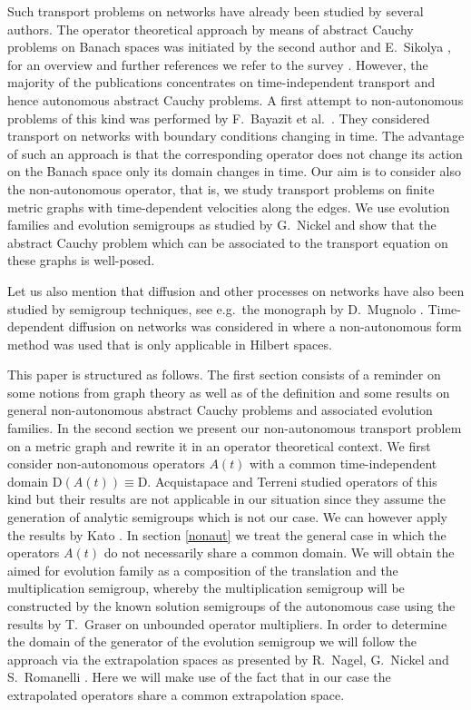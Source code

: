 \documentclass[a4paper,oneside,10pt]{amsart}
\theoremstyle{definition}
\numberwithin{equation}{section}
\def\dom{\mathrm{D}}
\begin{document}
\medskip
Such transport problems on networks have  already been studied by several authors. The operator theoretical approach by means of abstract Cauchy problems on Banach spaces was initiated by the second author and E.~Sikolya \cite{KS2005}, for an overview and further references  we refer to the survey \cite{KP2020}. However, the majority of the publications concentrates on time-independent transport and hence autonomous abstract Cauchy problems. A first attempt to non-autonomous problems of this kind was performed by F.~Bayazit et al.~\cite{BDF2013}. They considered transport on networks with boundary conditions changing in time. The advantage of such an approach is that the corresponding operator does not change its action on the Banach space only its domain changes in time. Our aim is to consider also the non-autonomous operator, that is, we study transport problems on finite metric graphs with time-dependent velocities along the edges. We use evolution families and evolution semigroups as studied by G.~Nickel \cite{N1997} and show that the abstract Cauchy problem which can be associated to the transport equation on these graphs is well-posed. 

\medskip
Let us also mention that diffusion and other processes on networks have also been studied by semigroup techniques, see e.g.~the monograph by D.~Mugnolo \cite{Delio2014}. Time-dependent diffusion on networks was considered in \cite{ADK2014} where a non-autonomous form method was used that is only applicable in Hilbert spaces.

\medskip
This paper is structured as follows. The first section consists of a  reminder on some notions from  graph theory as well as  of the definition and some results on general  non-autonomous abstract Cauchy problems and associated evolution families.  In the second section   we present our non-autonomous transport problem on a metric graph and rewrite it in an operator theoretical context. We first consider  non-autonomous operators $A(t)$ with a common time-independent domain {$\dom( A(t)) \equiv \dom$}. Acquistapace and Terreni \cite{AT1984} studied operators of this kind but their results  are not applicable in our situation since they assume the generation of analytic semigroups which is not our case. We can however apply the results by Kato   \cite{K1953}. In section \ref{nonaut} we treat the general case in which the operators $A(t)$ do not necessarily share a common domain. We will obtain the aimed for evolution family  as a composition of the translation and the multiplication semigroup, whereby the multiplication semigroup will be constructed by  the known solution semigroups of the autonomous case using the results by T.~Graser \cite{G1997}  on unbounded operator multipliers. In order to determine the domain of the generator of the evolution semigroup we will follow the approach via the extrapolation spaces as presented by R.~Nagel, G.~Nickel and S.~Romanelli \cite{NNR1996}. Here we will make use of the fact that in our case the extrapolated operators share a common extrapolation space. 
\end{document}
